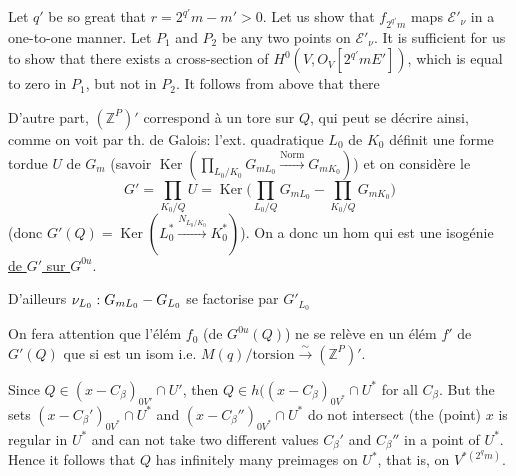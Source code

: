 Let $q'$ be so great that $r=2^{q'}m-m'>0$. Let us show that $f_{2^{q'}m}$ maps $\mathcal E'_\nu$ in a one-to-one manner. Let $P_1$ and $P_2$ be any two points on $\mathcal E'_\nu$. It is sufficient for us to show that there exists a cross-section of $H^0(V,O_V[2^{q'}mE'])$, which is equal to zero in $P_1$, but not in $P_2$. It follows from above that there

D'autre part, $(\mathbb Z^P)'$ correspond à un tore sur $Q$, qui peut se décrire ainsi, comme on voit par th. de Galois: l'ext. quadratique $L_0$ de $K_0$ définit une forme tordue $U$ de $G_m$ (savoir $\operatorname{Ker}(\prod_{L_0/K_0}G_{mL_0}\xrightarrow{\text{Norm}}G_{mK_0})$) et on considère le
\[
G'=\prod_{K_0/Q}U=\operatorname{Ker}\bigl(\prod_{L_0/Q}G_{mL_0}\mathbin{-}\prod_{K_0/Q}G_{mK_0}\bigr)
\]
(donc $G'(Q)=\operatorname{Ker}(L_0^*\xrightarrow{N_{L_0/K_0}}K_0^*)$). On a donc un hom
qui est une isogénie \uline{de $G'$ sur $G^{0u}$}.

D'ailleurs $\nu_{{L_0}}:G_{mL_0}\mathbin{-}G_{L_0}$ se factorise par $G'_{L_0}$

On fera attention que l'élém $f_0$  (de $G^{0u}(Q)$) ne se relève en un élém  $f'$ de $G'(Q)$ que si \inserted{$\varphi$} est un isom i.e. $M(q)/\text{torsion}\xrightarrow{\sim}(\mathbb Z^P)'$.

Since $Q\in(x-C_\beta)_{0V'}\cap U'$, then $Q\in h((x-C_\beta)_{0V^*}\cap U^*$ for all $C_\beta$. But the sets $(x-C_\beta')_{0V^*}\cap U^*$ and $(x-C_\beta'')_{0V^*}\cap U^*$ do not intersect (the (point) $x$ is regular in $U^*$ and can not take two different values $C_\beta'$ and $C_\beta''$ in a point of $U^*$. Hence it follows that $Q$ has infinitely many preimages on $U^*$, that is, on $V^{*(2^qm)}$.

